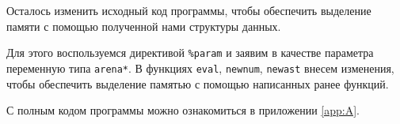 Осталось изменить исходный код программы, чтобы обеспечить выделение памяти с
помощью полученной нами структуры данных.

Для этого воспользуемся директивой \verb|%param| и заявим в качестве параметра
переменную типа \verb|arena*|. В функциях \verb|eval|, \verb|newnum|,
\verb|newast| внесем изменения, чтобы обеспечить выделение памятью с помощью
написанных ранее функций.

С полным кодом программы можно ознакомиться в приложении \ref{app:A}.
